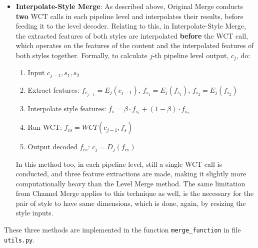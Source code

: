 \begin{itemize}
	\item \textbf{Interpolate-Style Merge}: As described above, Original Merge conducts \textbf{two} WCT calls in each pipeline level and interpolates their results, before feeding it to the level decoder. Relating to this, in Interpolate-Style Merge, the extracted features of both styles are interpolated \textbf{before} the WCT call, which operates on the features of the content and the interpolated features of both styles together. Formally, to calculate $j$-th pipeline level output, $c_j$, do:
	\begin{enumerate}
		\item Input $c_{j-1}, s_1, s_2$
		\item Extract features: $f_{c_{j-1}} = E_j(c_{j-1})$, $f_{s_1} = E_j(f_{s_1})$, $f_{s_2} = E_j(f_{s_2})$
		\item Interpolate style features: $\tilde{f_{s}} = \beta\cdot f_{s_1} + (1-\beta)\cdot f_{s_2}$
		\item Run WCT: $f_{cs} = WCT(c_{j-1}, \tilde{f_{s}})$
		\item Output decoded $f_{cs}$: $c_j = D_j(f_{cs})$
	\end{enumerate}
	In this method too, in each pipeline level, still a single WCT call is conducted, and three feature extractions are made, making it slightly more computationally heavy than the Level Merge method. The same limitation from Channel Merge applies to this technique as well, is the necessary for the pair of style to have same dimensions, which is done, again, by resizing the style inputs.
\end{itemize}
These three methods are implemented in the function \texttt{merge\_function} in file \texttt{utils.py}.
